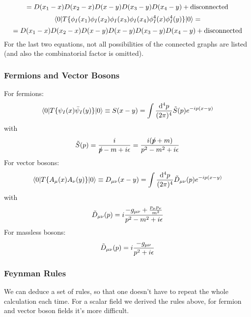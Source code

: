 \begin{equation*}
  =D(x_1-x)D(x_2-x)D(x-y)D(x_3-y)D(x_4-y) + \hbox{disconnected}
\end{equation*}
\begin{equation*}
  \mathinner{\langle{0|T\{\phi_I(x_1)\phi_I(x_2)\phi_I(x_3)\phi_I(x_4)\phi_I^4(x)\phi_I^4(y)\}|0}\rangle}=
\end{equation*}
\begin{equation*}
  =D(x_1-x)D(x_2-x)D(x-y)D(x-y)D(x_3-y)D(x_4-y) + \hbox{disconnected}
\end{equation*}
For the last two equations, not all possibilities of the connected graphs are listed (and also the combinatorial factor is omitted).

\subsubsection{Fermions and Vector Bosons}

For fermions: 
\begin{equation*}
  \mathinner{\langle{0|T\{\psi_I(x)\bar\psi_I(y)\}|0}\rangle}\equiv S(x-y)= \int {{\rm d}^4 p\over (2\pi)^4}\tilde S(p) e^{-ip(x-y)}
\end{equation*}
with 
\begin{equation*}
  \tilde S(p) = {i\over p \!\!\!/ - m +i\epsilon}= {i(p \!\!\!/+m)\over p^2-m^2+i\epsilon}
\end{equation*}
For vector bosons: 
\begin{equation*}
  \mathinner{\langle{0|T\{A_\mu(x)A_\nu(y)\}|0}\rangle}\equiv D_{\mu\nu}(x-y)= \int {{\rm d}^4 p\over (2\pi)^4}\tilde D_{\mu\nu}(p) e^{-ip(x-y)}
\end{equation*}
with 
\begin{equation*}
  \tilde D_{\mu\nu}(p) = i{-g_{\mu\nu}+{p_\mu p_\nu\over m^2}\over p^2-m^2+i\epsilon}
\end{equation*}
For massless bosons: 
\begin{equation*}
  \tilde D_{\mu\nu}(p) = i{-g_{\mu\nu}\over p^2+i\epsilon}
\end{equation*}

\subsubsection{Feynman Rules}

We can deduce a set of rules, so that one doesn't have to repeat the whole calculation each time. For a scalar field we derived the rules above, for fermion and vector boson fields it's more difficult.

